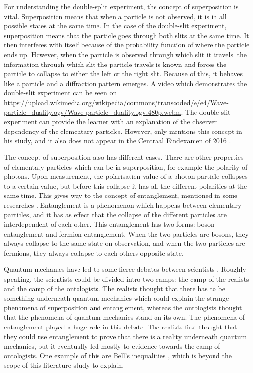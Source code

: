 \documentclass[11pt,twoside]{report} %
\begin{document}
For understanding the double-split experiment, the concept of superposition is vital. Superposition means that when a particle is not observed, it is in all possible states at the same time. In the case of the double-slit experiment, superposition means that the particle goes through both slits at the same time. It then interferes with itself because of the probability function of where the particle ends up. However, when the particle is observed through which slit it travels, the information through which slit the particle travels is known and forces the particle to collapse to either the left or the right slit. Because of this, it behaves like a particle and a diffraction pattern emerges. A video which demonstrates the double-slit experiment can be seen on \url{https://upload.wikimedia.org/wikipedia/commons/transcoded/e/e4/Wave-particle_duality.ogv/Wave-particle_duality.ogv.480p.webm}. The double-slit experiment can provide the learner with an explanation of the observer dependency of the elementary particles. However, only  mentions this concept in his study, and it also does not appear in the Centraal Eindexamen of 2016 \cite{eindexamen2016}.

The concept of superposition also has different cases. There are other properties of elementary particles which can be in superposition, for example the polarity of photons. Upon measurement, the polarisation value of a photon particle collapses to a certain value, but before this collapse it has all the different polarities at the same time. This gives way to the concept of entanglement, mentioned in some researches \cite{henriksen, hobson, kuttner}. Entanglement is a phenomenon which happens between elementary particles, and it has as effect that the collapse of the different particles are interdependent of each other. This entanglement has two forms: boson entanglement and fermion entanglement. When the two particles are bosons, they always collapse to the same state on observation, and when the two particles are fermions, they always collapse to each others opposite state.

Quantum mechanics have led to some fierce debates between scientists \cite{barnes}. Roughly speaking, the scientists could be divided intro two camps: the camp of the realists and the camp of the ontologists. The realists thought that there has to be something underneath quantum mechanics which could explain the strange phenomena of superposition and entanglement, whereas the ontologists thought that the phenomena of quantum mechanics stand on its own. The phenomena of entanglement played a huge role in this debate. The realists first thought that they could use entanglement to prove that there is a reality underneath quantum mechanics, but it eventually led mostly to evidence towards the camp of ontologists. One example of this are Bell's inequalities \cite{kuttner, muller}, which is beyond the scope of this literature study to explain.
\end{document}
